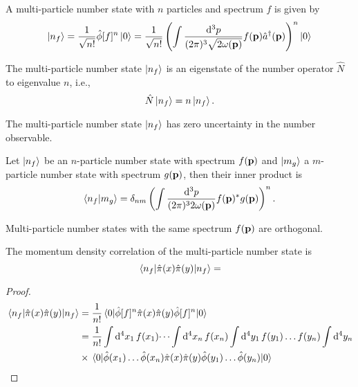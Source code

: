\begin{definition}
	A multi-particle number state with $n$ particles and spectrum $f$ is given by
	\begin{equation}
		\ket{n_f}
		=
		\frac{1}{\sqrt{n!}}
		\hat\phi[f]^n
		\ket{0}
		=
		\frac{1}{\sqrt{n!}}
		\left(
			\int\frac{\dd[3]{p}}{(2\pi)^3\sqrt{2\omega(\vb{p})}}
			f(\vb{p})
			\hat{a}^\dagger(\vb{p})
		\right)^n
		\ket{0}
	\end{equation}
\end{definition}
\begin{theorem}
	The multi-particle number state $\ket{n_f}$ is an eigenstate of the number operator $\hat{N}$ to eigenvalue $n$, i.e.,
	\begin{equation}
		\hat{N}
		\ket{n_f}
		=
		n
		\ket{n_f}
		.
	\end{equation}
\end{theorem}
\begin{corollary}
	The multi-particle number state $\ket{n_f}$ has zero uncertainty in the number observable.
\end{corollary}
\begin{theorem}\label{thm:multi_particle_number_state_inner_product}
	Let $\ket{n_f}$ be an $n$-particle number state with spectrum $f(\vb{p})$ and $\ket{m_g}$ a $m$-particle number state with spectrum $g(\vb{p})$, then their inner product is
	\begin{equation}
		\braket{n_f}{m_g}
		=
		\delta_{nm}
		\left(
			\int\frac{\dd[3]{p}}{(2\pi)^32\omega(\vb{p})}
			f(\vb{p})^*
			g(\vb{p})
		\right)^n
		.
	\end{equation}
\end{theorem}
\begin{corollary}
	Multi-particle number states with the same spectrum $f(\vb{p})$ are orthogonal.
\end{corollary}
\begin{lemma}
	The momentum density correlation of the multi-particle number state is
	\begin{equation}
		\expval{\hat\pi(x)\hat\pi(y)}{n_f}
		=
	\end{equation}
\end{lemma}
\begin{proof}
	\begin{equation*}
		\begin{split}
			\expval{
				\hat\pi(x)
				\hat\pi(y)
			}{n_f}
			&=
			\frac{1}{n!}
			\expval{
				\hat\phi[f]^n
				\hat\pi(x)
				\hat\pi(y)
				\hat\phi[f]^n
			}{0}
			\\
			&=
			\frac{1}{n!}
			\int\dd[4]{x_1}
			f(x_1)
			\dots
			\int\dd[4]{x_n}
			f(x_n)
			\int\dd[4]{y_1}
			f(y_1)
			\dots
			f(y_n)
			\int\dd[4]{y_n}
			\\
			&\times
			\expval{
				\hat\phi(x_1)
				\dots
				\hat\phi(x_n)
				\hat\pi(x)
				\hat\pi(y)
				\hat\phi(y_1)
				\dots
				\hat\phi(y_n)
			}{0}			
		\end{split}
	\end{equation*}
\end{proof}